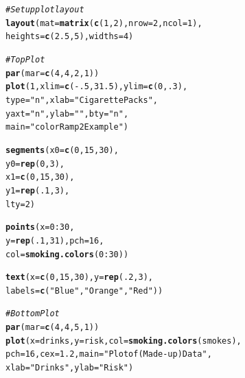 \documentclass{tufte-book}\usepackage[]{graphicx}\usepackage[]{color}
\makeatletter
\newcommand{\hlnum}[1]{\textcolor[rgb]{0.686,0.059,0.569}{#1}}%
\newcommand{\hlstr}[1]{\textcolor[rgb]{0.192,0.494,0.8}{#1}}%
\newcommand{\hlcom}[1]{\textcolor[rgb]{0.678,0.584,0.686}{\textit{#1}}}%
\newcommand{\hlopt}[1]{\textcolor[rgb]{0,0,0}{#1}}%
\newcommand{\hlstd}[1]{\textcolor[rgb]{0.345,0.345,0.345}{#1}}%
\newcommand{\hlkwc}[1]{\textcolor[rgb]{0.333,0.667,0.333}{#1}}%
\newcommand{\hlkwd}[1]{\textcolor[rgb]{0.737,0.353,0.396}{\textbf{#1}}}%
\newenvironment{kframe}{%
 \def\at@end@of@kframe{}%
 \ifinner\ifhmode%
  \def\at@end@of@kframe{\end{minipage}}%
  \begin{minipage}{\columnwidth}%
 \fi\fi%
 \def\FrameCommand##1{\hskip\@totalleftmargin \hskip-\fboxsep
 \colorbox{shadecolor}{##1}\hskip-\fboxsep
     \hskip-\linewidth \hskip-\@totalleftmargin \hskip\columnwidth}%
 \MakeFramed {\advance\hsize-\width
   \@totalleftmargin\z@ \linewidth\hsize
   \@setminipage}}%
 {\par\unskip\endMakeFramed%
 \at@end@of@kframe}
\newenvironment{knitrout}{}{} %
\makeatother
\begin{document}
\begin{footnotesize}
\begin{marginfigure}
\begin{tiny}
\begin{knitrout}
\begin{kframe}
\begin{alltt}
\hlcom{# Set up plot layout}
\hlkwd{layout}\hlstd{(}\hlkwc{mat} \hlstd{=} \hlkwd{matrix}\hlstd{(}\hlkwd{c}\hlstd{(}\hlnum{1}\hlstd{,} \hlnum{2}\hlstd{),} \hlkwc{nrow} \hlstd{=} \hlnum{2}\hlstd{,} \hlkwc{ncol} \hlstd{=} \hlnum{1}\hlstd{),}
       \hlkwc{heights} \hlstd{=} \hlkwd{c}\hlstd{(}\hlnum{2.5}\hlstd{,} \hlnum{5}\hlstd{),} \hlkwc{widths} \hlstd{=} \hlnum{4}\hlstd{)}

\hlcom{# Top Plot}
\hlkwd{par}\hlstd{(}\hlkwc{mar} \hlstd{=} \hlkwd{c}\hlstd{(}\hlnum{4}\hlstd{,} \hlnum{4}\hlstd{,} \hlnum{2}\hlstd{,} \hlnum{1}\hlstd{))}
\hlkwd{plot}\hlstd{(}\hlnum{1}\hlstd{,} \hlkwc{xlim} \hlstd{=} \hlkwd{c}\hlstd{(}\hlopt{-}\hlnum{.5}\hlstd{,} \hlnum{31.5}\hlstd{),} \hlkwc{ylim} \hlstd{=} \hlkwd{c}\hlstd{(}\hlnum{0}\hlstd{,} \hlnum{.3}\hlstd{),}
     \hlkwc{type} \hlstd{=} \hlstr{"n"}\hlstd{,} \hlkwc{xlab} \hlstd{=} \hlstr{"Cigarette Packs"}\hlstd{,}
     \hlkwc{yaxt} \hlstd{=} \hlstr{"n"}\hlstd{,} \hlkwc{ylab} \hlstd{=} \hlstr{""}\hlstd{,} \hlkwc{bty} \hlstd{=} \hlstr{"n"}\hlstd{,}
     \hlkwc{main} \hlstd{=} \hlstr{"colorRamp2 Example"}\hlstd{)}

\hlkwd{segments}\hlstd{(}\hlkwc{x0} \hlstd{=} \hlkwd{c}\hlstd{(}\hlnum{0}\hlstd{,} \hlnum{15}\hlstd{,} \hlnum{30}\hlstd{),}
         \hlkwc{y0} \hlstd{=} \hlkwd{rep}\hlstd{(}\hlnum{0}\hlstd{,} \hlnum{3}\hlstd{),}
         \hlkwc{x1} \hlstd{=} \hlkwd{c}\hlstd{(}\hlnum{0}\hlstd{,} \hlnum{15}\hlstd{,} \hlnum{30}\hlstd{),}
         \hlkwc{y1} \hlstd{=} \hlkwd{rep}\hlstd{(}\hlnum{.1}\hlstd{,} \hlnum{3}\hlstd{),}
         \hlkwc{lty} \hlstd{=} \hlnum{2}\hlstd{)}

\hlkwd{points}\hlstd{(}\hlkwc{x} \hlstd{=} \hlnum{0}\hlopt{:}\hlnum{30}\hlstd{,}
       \hlkwc{y} \hlstd{=} \hlkwd{rep}\hlstd{(}\hlnum{.1}\hlstd{,} \hlnum{31}\hlstd{),} \hlkwc{pch} \hlstd{=} \hlnum{16}\hlstd{,}
       \hlkwc{col} \hlstd{=} \hlkwd{smoking.colors}\hlstd{(}\hlnum{0}\hlopt{:}\hlnum{30}\hlstd{))}

\hlkwd{text}\hlstd{(}\hlkwc{x} \hlstd{=} \hlkwd{c}\hlstd{(}\hlnum{0}\hlstd{,} \hlnum{15}\hlstd{,} \hlnum{30}\hlstd{),} \hlkwc{y} \hlstd{=} \hlkwd{rep}\hlstd{(}\hlnum{.2}\hlstd{,} \hlnum{3}\hlstd{),}
     \hlkwc{labels} \hlstd{=} \hlkwd{c}\hlstd{(}\hlstr{"Blue"}\hlstd{,} \hlstr{"Orange"}\hlstd{,} \hlstr{"Red"}\hlstd{))}

\hlcom{# Bottom Plot}
\hlkwd{par}\hlstd{(}\hlkwc{mar} \hlstd{=} \hlkwd{c}\hlstd{(}\hlnum{4}\hlstd{,} \hlnum{4}\hlstd{,} \hlnum{5}\hlstd{,} \hlnum{1}\hlstd{))}
\hlkwd{plot}\hlstd{(}\hlkwc{x} \hlstd{= drinks,} \hlkwc{y} \hlstd{= risk,} \hlkwc{col} \hlstd{=} \hlkwd{smoking.colors}\hlstd{(smokes),}
     \hlkwc{pch} \hlstd{=} \hlnum{16}\hlstd{,} \hlkwc{cex} \hlstd{=} \hlnum{1.2}\hlstd{,} \hlkwc{main} \hlstd{=} \hlstr{"Plot of (Made-up) Data"}\hlstd{,}
     \hlkwc{xlab} \hlstd{=} \hlstr{"Drinks"}\hlstd{,} \hlkwc{ylab} \hlstd{=} \hlstr{"Risk"}\hlstd{)}


\end{alltt}
\end{kframe}
\end{knitrout}
\end{tiny}
\end{marginfigure}
\end{footnotesize}
\end{document}
